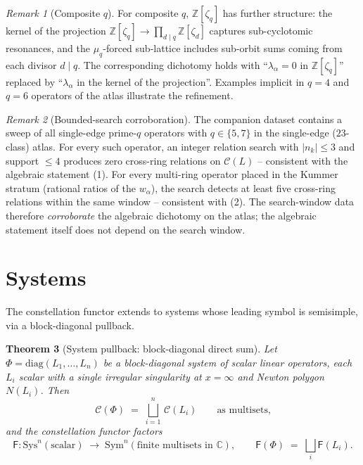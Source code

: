 \documentclass[11pt,a4paper]{article}
\theoremstyle{plain}
\newtheorem{theorem}{Theorem}[section]
\theoremstyle{definition}
\theoremstyle{remark}
\newtheorem{remark}[theorem]{Remark}
\newcommand{\Cl}{\mathcal{C}}
\newcommand{\Fclass}{\mathsf{F}}
\newcommand{\Sys}{\mathrm{Sys}}
\newcommand{\Sym}{\mathrm{Sym}}
\newcommand{\Zlc}{\mathbb{Z}[\zeta_q]}
\begin{document}
\begin{remark}[Composite $q$]\label{rem:D2-composite}
For composite $q$, $\Zlc$ has further structure: the kernel of the
projection $\Zlc \to \prod_{d \mid q} \mathbb{Z}[\zeta_d]$ captures
sub-cyclotomic resonances, and the $\mu_q$-forced sub-lattice includes
sub-orbit sums coming from each divisor $d \mid q$. The corresponding
dichotomy holds with ``$\lambda_\alpha = 0$ in $\Zlc$'' replaced by
``$\lambda_\alpha$ in the kernel of the projection''. Examples implicit
in $q = 4$ and $q = 6$ operators of the atlas illustrate the refinement.
\end{remark}

\begin{remark}[Bounded-search corroboration]\label{rem:D2-search}
The companion dataset \cite{wkb_dataset_v1} contains a sweep of all
single-edge prime-$q$ operators with $q \in \{5, 7\}$ in the
single-edge ($23$-class) atlas. For every such operator, an integer
relation search with $|n_k| \le 3$ and support $\le 4$ produces zero
cross-ring relations on $\Cl(L)$ -- consistent with the algebraic
statement (1). For every multi-ring operator placed in
the Kummer stratum (rational ratios of the $w_\alpha$), the search
detects at least five cross-ring relations within the same window --
consistent with (2). The search-window data therefore
\emph{corroborate} the algebraic dichotomy on the atlas; the algebraic
statement itself does not depend on the search window.
\end{remark}


\section{Systems}\label{sec:systems}

The constellation functor extends to systems whose leading symbol is
semisimple, via a block-diagonal pullback.

\begin{theorem}[System pullback: block-diagonal direct sum]\label{thm:S1}
Let $\Phi = \mathrm{diag}(L_1, \dots, L_n)$ be a block-diagonal system of
scalar linear operators, each $L_i$ scalar with a single irregular
singularity at $x = \infty$ and Newton polygon $N(L_i)$. Then
\[
   \Cl(\Phi) \;=\; \bigsqcup_{i = 1}^{n}\, \Cl(L_i)
   \qquad \text{as multisets,}
\]
and the constellation functor factors
\[
   \Fclass \colon \Sys^n(\mathrm{scalar}) \;\longrightarrow\;
   \Sym^n(\text{finite multisets in } \mathbb{C}),
   \qquad \Fclass(\Phi) \;=\; \bigsqcup_i \Fclass(L_i).
\]
\end{theorem}
\end{document}
